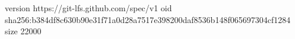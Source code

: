 version https://git-lfs.github.com/spec/v1
oid sha256:b384df8c630b90e31f71a0d28a7517e398200daf8536b148f065697304cf1284
size 22000
